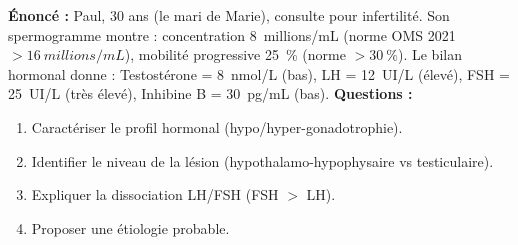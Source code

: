 \documentclass[11pt]{article}
\begin{document}
\begin{exoresolu}
\textbf{Énoncé :} Paul, 30 ans (le mari de Marie), consulte pour infertilité. Son spermogramme montre : concentration \SI{8}{millions/mL} (norme OMS 2021 $> \SI{16}{millions/mL}$), mobilité progressive \SI{25}{\percent} (norme $> \SI{30}{\percent}$). Le bilan hormonal donne : Testostérone = \SI{8}{nmol/L} (bas), LH = \SI{12}{UI/L} (élevé), FSH = \SI{25}{UI/L} (très élevé), Inhibine B = \SI{30}{pg/mL} (bas).
\textbf{Questions :}
\begin{enumerate}
    \item Caractériser le profil hormonal (hypo/hyper-gonadotrophie).
    \item Identifier le niveau de la lésion (hypothalamo-hypophysaire vs testiculaire).
    \item Expliquer la dissociation LH/FSH (FSH $>$ LH).
    \item Proposer une étiologie probable.
\end{enumerate}


\end{exoresolu}
\end{document}
